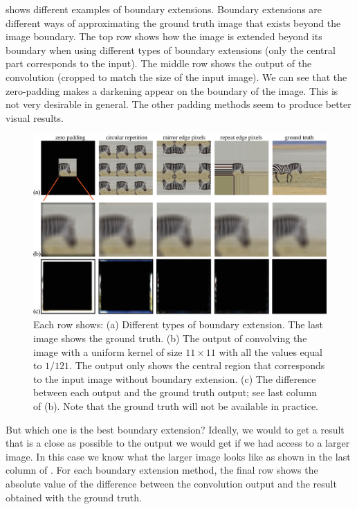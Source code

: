 \Fig{\ref{fig:boundaries}} shows different examples of boundary extensions. Boundary extensions are different ways of approximating the ground truth image that exists beyond the image boundary.
The top row shows how the image is extended beyond its boundary when using different types of boundary extensions (only the central part corresponds to the input). The middle row shows the output of the convolution (cropped to match the size of the input image). We can see that the zero-padding makes a darkening appear on the boundary of the image. This is not very desirable in general. The other padding methods seem to produce better visual results.


\begin{figure}
	\includegraphics[width=1\linewidth]{figures/linear_image_filtering/boundary.eps}
	\caption{Each row shows: (a) Different types of boundary extension. The last image shows the ground truth. (b) The output of convolving the image with a uniform kernel of size $11 \times 11$ with all the values equal to $1/121$. The output only shows the central region that corresponds to the input image without boundary extension. (c) The difference between each output and the ground truth output; see last column of (b). Note that the ground truth will not be available in practice.
	}
	\label{fig:boundaries}
\end{figure}

But which one is the best boundary extension? Ideally, we would to get a result that is a close as possible to the output we would get if we had access to a larger image. In this case we know what the larger image looks like as shown in the last column of \fig{\ref{fig:boundaries}}. For each boundary extension method, the final row shows the absolute value of the difference between the convolution output and the result obtained with the ground truth.

